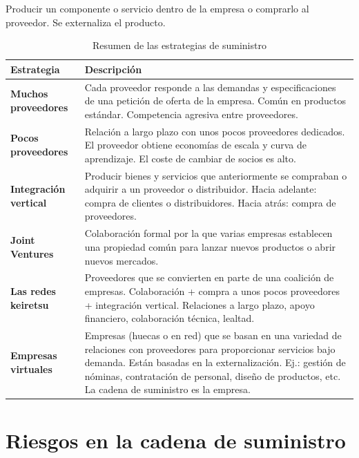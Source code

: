 \documentclass[12pt]{report} %
\begin{document}
\begin{definicion}
Producir un componente o servicio dentro de la empresa o comprarlo al proveedor. Se externaliza el producto.
\end{definicion}

\begin{table}[H]
\centering
\caption{Resumen de las estrategias de suministro}
\begin{tabular}{|p{4cm}|p{12cm}|}
\hline
\textbf{Estrategia} & \textbf{Descripción} \\ \hline
\textbf{Muchos proveedores} & Cada proveedor responde a las demandas y especificaciones de una petición de oferta de la empresa. Común en productos estándar. Competencia agresiva entre proveedores. \\ \hline
\textbf{Pocos proveedores} & Relación a largo plazo con unos pocos proveedores dedicados. El proveedor obtiene economías de escala y curva de aprendizaje. El coste de cambiar de socios es alto. \\ \hline
\textbf{Integración vertical} & Producir bienes y servicios que anteriormente se compraban o adquirir a un proveedor o distribuidor. Hacia adelante: compra de clientes o distribuidores. Hacia atrás: compra de proveedores. \\ \hline
\textbf{Joint Ventures} & Colaboración formal por la que varias empresas establecen una propiedad común para lanzar nuevos productos o abrir nuevos mercados. \\ \hline
\textbf{Las redes keiretsu} & Proveedores que se convierten en parte de una coalición de empresas. Colaboración + compra a unos pocos proveedores + integración vertical. Relaciones a largo plazo, apoyo financiero, colaboración técnica, lealtad. \\ \hline
\textbf{Empresas virtuales} & Empresas (huecas o en red) que se basan en una variedad de relaciones con proveedores para proporcionar servicios bajo demanda. Están basadas en la externalización. Ej.: gestión de nóminas, contratación de personal, diseño de productos, etc. La cadena de suministro es la empresa. \\ \hline
\end{tabular}
\end{table}

\hypertarget{riesgos-en-la-cadena-de-suministro}{%
\section{Riesgos en la cadena de
suministro}\label{riesgos-en-la-cadena-de-suministro}}
\end{document}
